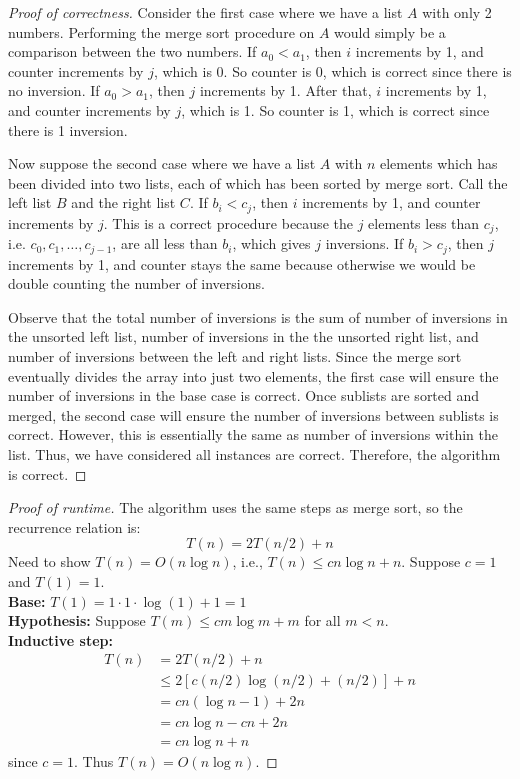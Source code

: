 \documentclass{article}
\begin{document}
\begin{proof}[Proof of correctness]
Consider the first case where we  have a list $A$ with only 2 numbers. Performing the merge sort procedure on $A$ would simply be a comparison between the two numbers. If $a_0<a_1$, then $i$ increments by 1, and counter increments by $j$, which is 0. So counter is 0, which is correct since there is no inversion. If $a_0>a_1$, then $j$ increments by 1. After that, $i$ increments by 1, and counter increments by $j$, which is 1. So counter is 1, which is correct since there is 1 inversion.

Now suppose the second case where we have a list $A$ with $n$ elements which has been divided into two lists, each of which has been sorted by merge sort. Call the left list $B$ and the right list $C$. If $b_i<c_j$, then $i$ increments by 1, and counter increments by $j$. This is a correct procedure because the $j$ elements less than $c_j$, i.e. $c_0, c_1,\dots,c_{j-1}$, are all less than $b_i$, which gives $j$ inversions. If $b_i>c_j$, then $j$ increments by 1, and counter stays the same because otherwise we would be double counting the number of inversions.

Observe that the total number of inversions is the sum of number of inversions in the unsorted left list, number of inversions in the the unsorted right list, and number of inversions between the left and right lists. Since the merge sort eventually divides the array into just two elements, the first case will ensure the number of inversions in the base case is correct. Once sublists are sorted and merged, the second case will ensure the number of inversions between sublists is correct. However, this is essentially the same as number of inversions within the list. Thus, we have considered all instances are correct. Therefore, the algorithm is correct.
\end{proof}

\begin{proof}[Proof of runtime]
The algorithm uses the same steps as merge sort, so the recurrence relation is:
$$T(n)=2T(n/2)+n$$
Need to show $T(n)=O(n\log n)$, i.e., $T(n)\leq cn\log n + n$. Suppose $c=1$ and $T(1)=1$.\\
\textbf{Base:} $T(1) = 1\cdot 1\cdot\log(1)+1 = 1$\\
\textbf{Hypothesis:} Suppose $T(m)\leq cm\log m + m$ for all $m<n$.\\
\textbf{Inductive step:}
	\begin{align*}
	T(n)&=2T(n/2)+n \\
	&\leq 2[c(n/2)\log(n/2)+(n/2)]+n\\
	&=cn(\log n -1)+2n\\
	&=cn\log n-cn+2n\\
	&=cn\log n + n
	\end{align*}
since $c=1$. Thus $T(n)=O(n\log n)$.
\end{proof}
\end{document}
